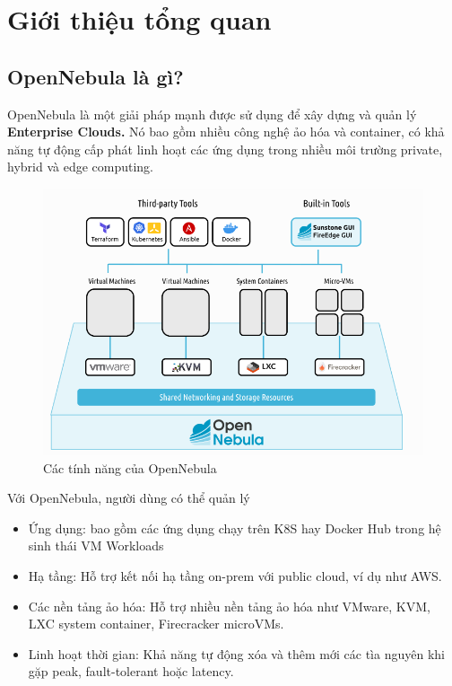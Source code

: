 \chapter{Giới thiệu tổng quan}
\section{OpenNebula là gì?}


OpenNebula là một giải pháp mạnh được sử dụng để xây dựng và quản lý \textbf{Enterprise Clouds.} Nó bao gồm nhiều công nghệ ảo hóa và container, có khả năng tự động cấp phát linh hoạt các ứng dụng trong nhiều môi trường private, hybrid và edge computing. \\
\begin{figure}
    \centering
    \includegraphics*[scale=0.4]{graphics/main/overivew/chap1-opennebula-feature.png}
    \caption{Các tính năng của OpenNebula}
    \label{fig:chap1-opennebula-feature}
\end{figure}

Với OpenNebula, người dùng có thể quản lý
\begin{itemize}
    \item Ứng dụng: bao gồm các ứng dụng chạy trên K8S hay Docker Hub trong hệ sinh thái VM Workloads
    \item Hạ tầng: Hỗ trợ kết nối hạ tầng on-prem với public cloud, ví dụ như AWS.
    \item Các nền tảng ảo hóa: Hỗ trợ nhiều nền tảng ảo hóa như VMware, KVM, LXC system container, Firecracker microVMs.
    \item Linh hoạt thời gian: Khả năng tự động xóa và thêm mới các tìa nguyên khi gặp peak, fault-tolerant hoặc latency.
\end{itemize}
